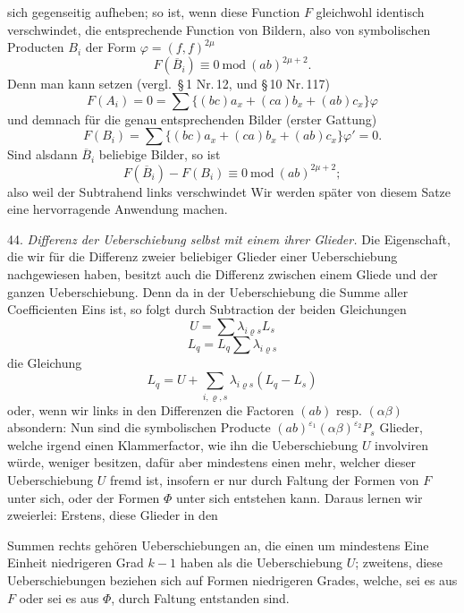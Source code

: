 sich gegenseitig aufheben; so ist, wenn diese Function $F$ gleichwohl
identisch verschwindet, die entsprechende Function von Bildern, also von
symbolischen Producten $B_i$ der Form $\varphi=(f,f)^{2\mu}$
\[
F(\overline{B}_i)\equiv 0\ \mathrm{mod}\ (ab)^{2\mu+2}.
\]
\grqq{} Denn man kann setzen (vergl.\ \S\,1 Nr.\,12, und \S\,10 Nr.\,117)
\[
F(A_i)=0=\sum\{(bc)a_x+(ca)b_x+(ab)c_x\}\varphi
\]
und demnach für die genau entsprechenden Bilder (erster Gattung)
\[
F(B_i)=\sum\{(bc)a_x+(ca)b_x+(ab)c_x\}\varphi'=0.
\]
Sind alsdann $\overline{B}_i$ beliebige Bilder, so ist
\[
F(\overline{B}_i)-F(B_i)\equiv 0\ \mathrm{mod}\ (ab)^{2\mu+2};
\]
also weil der Subtrahend links verschwindet
Wir werden später von diesem Satze eine hervorragende Anwendung machen.

44. \textit{Differenz der Ueberschiebung selbst mit einem ihrer Glieder.}
Die Eigenschaft, die wir für die Differenz zweier beliebiger Glieder einer
Ueberschiebung nachgewiesen haben, besitzt auch die Differenz zwischen einem
Gliede und der ganzen Ueberschiebung. Denn da in der Ueberschiebung die
Summe aller Coefficienten Eins ist, so folgt durch Subtraction der beiden
Gleichungen
\[
U=\sum\lambda_{i\varrho s}L_s
\]
\[
L_q=L_q\sum\lambda_{i\varrho s}
\]
die Gleichung
\[
L_q=U+\sum_{i,\varrho,s}\lambda_{i\varrho s}(L_q-L_s)
\]
oder, wenn wir links in den Differenzen die Factoren $(ab)$ resp.
$(\alpha\beta)$ absondern:
Nun sind die symbolischen Producte $(ab)^{\varepsilon_1}(\alpha\beta)^{\varepsilon_2}P_s$
Glieder, welche irgend einen Klammerfactor, wie ihn die Ueberschiebung $U$
involviren würde, weniger besitzen, dafür aber mindestens einen mehr, welcher
dieser Ueberschiebung $U$ fremd ist, insofern er nur durch Faltung der Formen
von $F$ unter sich, oder der Formen $\Phi$ unter sich entstehen kann. Daraus
lernen wir zweierlei: Erstens, diese Glieder in den


Summen rechts gehören Ueberschiebungen an, die einen um mindestens Eine
Einheit niedrigeren Grad $k-1$ haben als die Ueberschiebung $U$; zweitens,
diese Ueberschiebungen beziehen sich auf Formen niedrigeren Grades, welche,
sei es aus $F$ oder sei es aus $\Phi$, durch Faltung entstanden sind.

